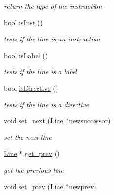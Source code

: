 \begin{DoxyCompactItemize}
\begin{DoxyCompactList}\small\item\em return the type of the instruction \end{DoxyCompactList}\item 
\hypertarget{class_line_a57e724949fa0828dfdd2a1bb0f7db8d0}{bool \hyperlink{class_line_a57e724949fa0828dfdd2a1bb0f7db8d0}{is\+Inst} ()}\label{class_line_a57e724949fa0828dfdd2a1bb0f7db8d0}

\begin{DoxyCompactList}\small\item\em tests if the line is an instruction \end{DoxyCompactList}\item 
\hypertarget{class_line_a8323f3df960924826199bd607198ac7f}{bool \hyperlink{class_line_a8323f3df960924826199bd607198ac7f}{is\+Label} ()}\label{class_line_a8323f3df960924826199bd607198ac7f}

\begin{DoxyCompactList}\small\item\em tests if the line is a label \end{DoxyCompactList}\item 
\hypertarget{class_line_ad014e40a75c8a04e6a091ae4110579bc}{bool \hyperlink{class_line_ad014e40a75c8a04e6a091ae4110579bc}{is\+Directive} ()}\label{class_line_ad014e40a75c8a04e6a091ae4110579bc}

\begin{DoxyCompactList}\small\item\em tests if the line is a directive \end{DoxyCompactList}\item 
\hypertarget{class_line_a66770cb09833f18ec4d5b494f5edae77}{void \hyperlink{class_line_a66770cb09833f18ec4d5b494f5edae77}{set\+\_\+next} (\hyperlink{class_line}{Line} $\ast$newsuccessor)}\label{class_line_a66770cb09833f18ec4d5b494f5edae77}

\begin{DoxyCompactList}\small\item\em set the next line \end{DoxyCompactList}\item 
\hypertarget{class_line_ae834b48e9f1c9450f93ec7bb6a43fb1a}{\hyperlink{class_line}{Line} $\ast$ \hyperlink{class_line_ae834b48e9f1c9450f93ec7bb6a43fb1a}{get\+\_\+prev} ()}\label{class_line_ae834b48e9f1c9450f93ec7bb6a43fb1a}

\begin{DoxyCompactList}\small\item\em get the previous line \end{DoxyCompactList}\item 
\hypertarget{class_line_abf7301d0514bf6dafdc9da9ad79a4341}{void \hyperlink{class_line_abf7301d0514bf6dafdc9da9ad79a4341}{set\+\_\+prev} (\hyperlink{class_line}{Line} $\ast$newprev)}\label{class_line_abf7301d0514bf6dafdc9da9ad79a4341}


\end{DoxyCompactItemize}
